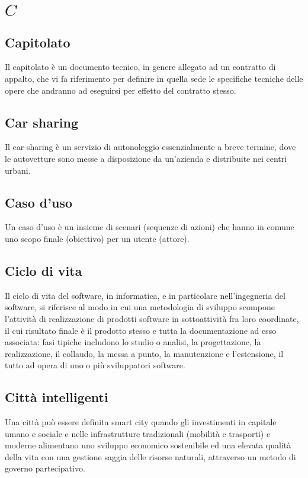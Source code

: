 \section{\quad$C\quad$}
\subsection{Capitolato}
Il capitolato è un documento tecnico, in genere allegato ad un contratto di appalto, che vi fa riferimento per definire in quella sede le specifiche tecniche delle opere che andranno ad eseguirsi per effetto del contratto stesso.

\subsection{Car sharing}
Il car-sharing è un servizio di autonoleggio essenzialmente a breve termine, dove le autovetture sono messe a disposizione da un’azienda e distribuite nei centri urbani.

\subsection{Caso d’uso}
Un caso d’uso è un insieme di scenari (sequenze di azioni) che hanno in comune uno scopo finale (obiettivo) per un utente (attore).

\subsection{Ciclo di vita}
Il ciclo di vita del software, in informatica, e in particolare nell'ingegneria del software, si riferisce al modo in cui una metodologia di sviluppo scompone l'attività di realizzazione di prodotti software in sottoattività fra loro coordinate, il cui risultato finale è il prodotto stesso e tutta la documentazione ad esso associata: fasi tipiche includono lo studio o analisi, la progettazione, la realizzazione, il collaudo, la messa a punto, la manutenzione e l'estensione, il tutto ad opera di uno o più sviluppatori software.


\subsection{Città intelligenti}
Una città può essere definita smart city quando gli investimenti in capitale umano e sociale e nelle infrastrutture tradizionali (mobilità e trasporti) e moderne alimentano uno sviluppo economico sostenibile ed una elevata qualità della vita con una gestione saggia delle risorse naturali, attraverso un metodo di governo partecipativo.

